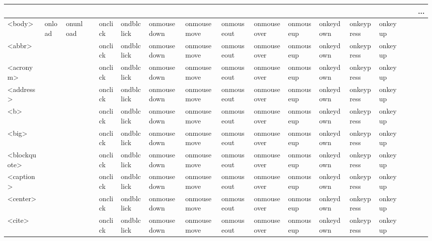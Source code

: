 
\begin{longtable}{|p{18pt}|p{15pt}|p{15pt}|p{10pt}|p{16pt}|p{16pt}|p{16pt}|p{16pt}|p{16pt}|p{16pt}|p{16pt}|p{16pt}|p{16pt}|p{16pt}|p{16pt}|p{16pt}|p{16pt}|p{16pt}|}
\multicolumn{18}{r}{...}
\endhead
\hline

\endfirsthead
\multicolumn{18}{r}{...}
\endfoot
\endlastfoot
\hline
<frameset>	& onload	& onunload &	&& 		&  &  &  &  &  &  &  &  &  & & & \\				
\hline													
<body>		& onload	& onunload &	&onclick	& ondblclick & onmousedown & onmousemove & onmouseout & onmouseover & onmouseup & onkeydown & onkeypress & onkeyup & & & & \\ 		
\hline
<abbr>		&	&	&	& onclick	& ondblclick & onmousedown & onmousemove & onmouseout & onmouseover & onmouseup & onkeydown & onkeypress & onkeyup & & & & \\				
\hline
<acronym>	&	&	&	& onclick	& ondblclick & onmousedown & onmousemove & onmouseout & onmouseover & onmouseup & onkeydown & onkeypress & onkeyup & & & & \\				
\hline
<address>	&	&	&	& onclick	& ondblclick & onmousedown & onmousemove & onmouseout & onmouseover & onmouseup & onkeydown & onkeypress & onkeyup & & & & \\				
\hline
<b>			&	&	&	& onclick	& ondblclick & onmousedown & onmousemove & onmouseout & onmouseover & onmouseup & onkeydown & onkeypress & onkeyup & & & & \\
\hline
<big>		&	&	&	& onclick	& ondblclick & onmousedown & onmousemove & onmouseout & onmouseover & onmouseup & onkeydown & onkeypress & onkeyup & & & & \\
\hline
<blockquote>	&	&	&	& onclick	& ondblclick & onmousedown & onmousemove & onmouseout & onmouseover & onmouseup & onkeydown & onkeypress & onkeyup & & & & \\
\hline
<caption>		&	&	&	& onclick	& ondblclick & onmousedown & onmousemove & onmouseout & onmouseover & onmouseup & onkeydown & onkeypress & onkeyup & & & & \\
\hline
<center>		&	&	&	& onclick	& ondblclick & onmousedown & onmousemove & onmouseout & onmouseover & onmouseup & onkeydown & onkeypress & onkeyup & & & & \\
\hline
<cite>		&	&	&	& onclick	& ondblclick & onmousedown & onmousemove & onmouseout & onmouseover & onmouseup & onkeydown & onkeypress & onkeyup & & & & \\

\end{longtable}
